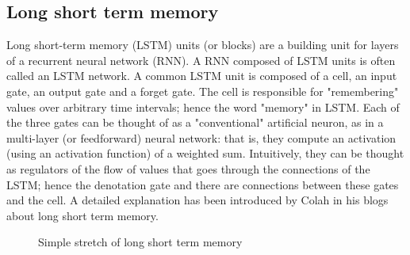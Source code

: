 \documentclass[12pt,a4paper]{report}
\begin{document}
\subsection{Long short term memory}
Long short-term memory (LSTM) units (or blocks) are a building unit for layers of a recurrent neural network (RNN). A RNN composed of LSTM units is often called an LSTM network. A common LSTM unit is composed of a cell, an input gate, an output gate and a forget gate. The cell is responsible for "remembering" values over arbitrary time intervals; hence the word "memory" in LSTM. Each of the three gates can be thought of as a "conventional" artificial neuron, as in a multi-layer (or feedforward) neural network: that is, they compute an activation (using an activation function) of a weighted sum. Intuitively, they can be thought as regulators of the flow of values that goes through the connections of the LSTM; hence the denotation gate and there are connections between these gates and the cell. A detailed explanation has been introduced by Colah in his blogs about long short term memory\cite{LSTM}.
\begin{figure}[H]
    \centering
    \caption{Simple stretch of long short term memory\cite{LSTM}}
\end{figure}
\end{document}

